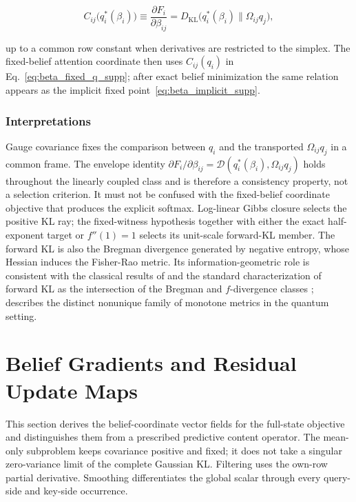 \documentclass[twoside,11pt]{article}
\begin{document}
\begin{equation}
C_{ij}\bigl(q_i^*(\beta_i)\bigr)
\equiv \frac{\partial F_i}{\partial\beta_{ij}}
= D_{\mathrm{KL}}\bigl(q_i^*(\beta_i) \| \Omega_{ij}q_j\bigr),
\end{equation}

up to a common row constant when derivatives are restricted to the simplex. The fixed-belief attention coordinate then uses $C_{ij}(q_i)$ in Eq.~\eqref{eq:beta_fixed_q_supp}; after exact belief minimization the same relation appears as the implicit fixed point~\eqref{eq:beta_implicit_supp}.

\subsubsection{Interpretations}
Gauge covariance fixes the comparison between $q_i$ and the transported $\Omega_{ij}q_j$ in a common frame. The envelope identity $\partial F_i/\partial\beta_{ij}=\mathcal D(q_i^*(\beta_i),\Omega_{ij}q_j)$ holds throughout the linearly coupled class and is therefore a consistency property, not a selection criterion. It must not be confused with the fixed-belief coordinate objective that produces the explicit softmax. Log-linear Gibbs closure selects the positive KL ray; the fixed-witness hypothesis together with either the exact half-exponent target or $f''(1)=1$ selects its unit-scale forward-KL member. The forward KL is also the Bregman divergence generated by negative entropy, whose Hessian induces the Fisher-Rao metric. Its information-geometric role is consistent with the classical results of \citet{Cencov1982} and the standard characterization of forward KL as the intersection of the Bregman and $f$-divergence classes \citep{Amari2016}; \citet{Petz1996} describes the distinct nonunique family of monotone metrics in the quantum setting.

\section{Belief Gradients and Residual Update Maps}\label{app:belief_revision}

This section derives the belief-coordinate vector fields for the full-state objective and distinguishes them from a prescribed predictive content operator. The mean-only subproblem keeps covariance positive and fixed; it does not take a singular zero-variance limit of the complete Gaussian KL. Filtering uses the own-row partial derivative. Smoothing differentiates the global scalar through every query-side and key-side occurrence.
\end{document}
